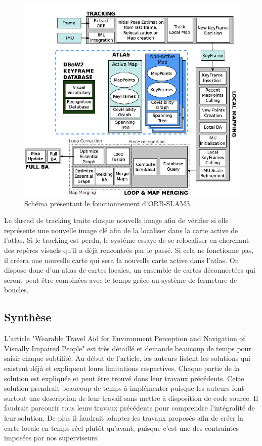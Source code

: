 \documentclass[11pt]{article}
\begin{document}
  \begin{figure}[hbt]  
    \includegraphics[width=\textwidth]{ORB_SLAM3.png}    
    \caption{Schéma présentant le fonctionnement d'ORB-SLAM3.}
    \label{fig:ORBSLAM3}
  \end{figure} 

  Le thread de tracking traite chaque nouvelle image afin de vérifier si elle représente une nouvelle image clé afin de la localiser
  dans la carte active de l'atlas. Si le tracking est perdu, le système essaye de se relocaliser en cherchant des repères visuels 
  qu'il a déjà rencontrés par le passé. Si cela ne fonctionne pas, il créera une nouvelle carte qui sera la nouvelle carte active dans l'atlas.
  On dispose donc d'un atlas de cartes locales, un ensemble de cartes déconnectées qui seront peut-être combinées avec le temps grâce au 
  système de fermeture de boucles.

  \pagebreak

  \subsection{Synthèse}

  L'article "Wearable Travel Aid for Environment Perception and Navigation of Visually Impaired People" est très détaillé et demande beaucoup 
  de temps pour saisir chaque subtilité.
  Au début de l'article, les auteurs listent les solutions qui existent déjà et expliquent leurs limitations respectives. 
  Chaque partie de la solution est expliquée et peut être trouvé dans leur travaux précédents. Cette solution prendrait beaucoup de temps
  à implémenter puisque les auteurs font surtout une description de leur travail sans mettre à disposition de code source. 
  Il faudrait parcourir tous leurs travaux précédents pour comprendre l'intégralité de leur solution. De plus il faudrait adapter les travaux
  proposés afin de créer la carte locale en temps-réel plutôt qu'avant, puisque c'est une des contraintes imposées par nos superviseurs. 
\end{document}
